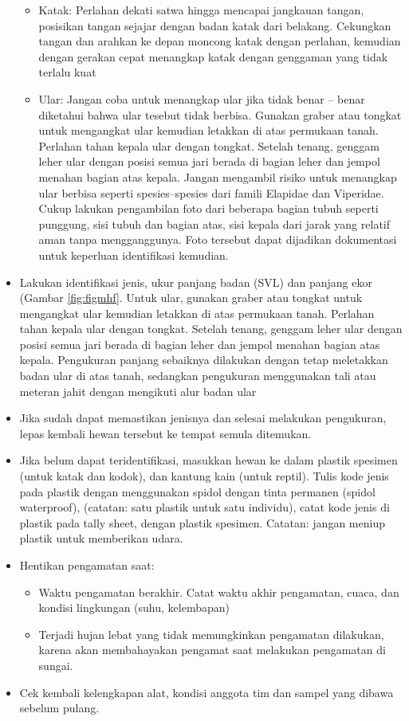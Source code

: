\documentclass[
  oneside]{book}
\providecommand{\tightlist}{%
  \setlength{\itemsep}{0pt}\setlength{\parskip}{0pt}}
\begin{document}
\begin{itemize}
  \begin{itemize}
  \tightlist
  \item
    Katak: Perlahan dekati satwa hingga mencapai jangkauan tangan, posisikan tangan sejajar dengan badan katak dari belakang. Cekungkan tangan dan arahkan ke depan moncong katak dengan perlahan, kemudian dengan gerakan cepat menangkap katak dengan genggaman yang tidak terlalu kuat
  \item
    Ular: Jangan coba untuk menangkap ular jika tidak benar -- benar diketahui bahwa ular tesebut tidak berbisa. Gunakan graber atau tongkat untuk mengangkat ular kemudian letakkan di atas permukaan tanah. Perlahan tahan kepala ular dengan tongkat. Setelah tenang, genggam leher ular dengan posisi semua jari berada di bagian leher dan jempol menahan bagian atas kepala. Jangan mengambil risiko untuk menangkap ular berbisa seperti spesies--spesies dari famili Elapidae dan Viperidae. Cukup lakukan pengambilan foto dari beberapa bagian tubuh seperti punggung, sisi tubuh dan bagian atas, sisi kepala dari jarak yang relatif aman tanpa mengganggunya. Foto tersebut dapat dijadikan dokumentasi untuk keperluan identifikasi kemudian.\\
  \end{itemize}
\item
  Lakukan identifikasi jenis, ukur panjang badan (SVL) dan panjang ekor (Gambar \ref{fig:figmhf}. Untuk ular, gunakan graber atau tongkat untuk mengangkat ular kemudian letakkan di atas permukaan tanah. Perlahan tahan kepala ular dengan tongkat. Setelah tenang, genggam leher ular dengan posisi semua jari berada di bagian leher dan jempol menahan bagian atas kepala. Pengukuran panjang sebaiknya dilakukan dengan tetap meletakkan badan ular di atas tanah, sedangkan pengukuran menggunakan tali atau meteran jahit dengan mengikuti alur badan ular
\item
  Jika sudah dapat memastikan jenisnya dan selesai melakukan pengukuran, lepas kembali hewan tersebut ke tempat semula ditemukan.
\item
  Jika belum dapat teridentifikasi, masukkan hewan ke dalam plastik spesimen (untuk katak dan kodok), dan kantung kain (untuk reptil). Tulis kode jenis pada plastik dengan menggunakan spidol dengan tinta permanen (spidol waterproof), (catatan: satu plastik untuk satu individu), catat kode jenis di plastik pada tally sheet, dengan plastik spesimen. Catatan: jangan meniup plastik untuk memberikan udara.
\item
  Hentikan pengamatan saat:

  \begin{itemize}
  \tightlist
  \item
    Waktu pengamatan berakhir. Catat waktu akhir pengamatan, cuaca, dan kondisi lingkungan (suhu, kelembapan)
  \item
    Terjadi hujan lebat yang tidak memungkinkan pengamatan dilakukan, karena akan membahayakan pengamat saat melakukan pengamatan di sungai.
  \end{itemize}
\item
  Cek kembali kelengkapan alat, kondisi anggota tim dan sampel yang dibawa sebelum pulang.
\end{itemize}
\end{document}
